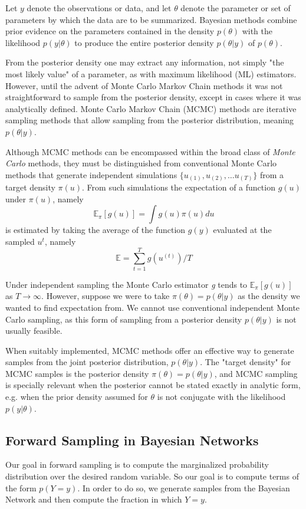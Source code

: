 \documentclass{article}
\begin{document}
Let $y$ denote the observations or data, and let $\theta$ denote the parameter or set of parameters by which the data are to be summarized. Bayesian methods combine prior evidence on the parameters contained in the density $p(\theta)$ with the likelihood $p(y|\theta)$ to produce the entire posterior density $p(\theta|y)$ of $p(\theta)$.

From the posterior density one may extract any information, not simply "the most likely value" of a parameter, as with maximum likelihood (ML) estimators. However, until the advent of Monte Carlo Markov Chain methods it was not straightforward to sample from the posterior density, except in cases where it was analytically defined. Monte Carlo Markov Chain (MCMC) methods are iterative sampling methods that allow sampling from the posterior distribution, meaning $p(\theta|y)$.

Although MCMC methods can be encompassed within the broad class of \textit{Monte Carlo} methods, they must be distinguished from conventional Monte Carlo methods that generate independent simulations $\{ u_(1), u_(2), \ldots u_(T) \}$ from a target density $\pi(u)$. From such simulations the expectation of a function $g(u)$ under $\pi(u)$, namely
    $$ \mathbb{E}_{\pi}[g(u)] = \int{g(u)\pi(u)du}$$
    is estimated by taking the average of the function $g(y)$ evaluated at the sampled $u^{t}$, namely
    $$ \mathbb{E} = \sum_{t=1}^{T} g(u^{(t)})/T $$

Under independent sampling the Monte Carlo estimator \textit{g} tends to $\mathbb{E}_{\pi}[g(u)]$ as $T \rightarrow \infty$.
However, suppose we were to take $\pi(\theta) = p(\theta|y)$ as the density we wanted to find expectation from. We cannot use conventional independent Monte Carlo sampling, as this form of sampling from a posterior density $p(\theta|y)$ is not usually feasible.

When suitably implemented, MCMC methods offer an effective way to generate samples from the joint posterior distribution, $p(\theta|y)$. The "target density" for MCMC samples is the posterior density $\pi(\theta) = p(\theta|y)$, and MCMC sampling is specially relevant when the posterior cannot be stated exactly in analytic form, e.g. when the prior density assumed for $\theta$ is not conjugate with the likelihood $p(y|\theta)$.

\subsection{Forward Sampling in Bayesian Networks}
    Our goal in forward sampling is to compute the marginalized probability distribution over the desired random variable. So our goal is to compute terms of the form $p(Y=y)$. In order to do so, we generate samples from the Bayesian Network and then compute the fraction in which $Y=y$.
\end{document}
